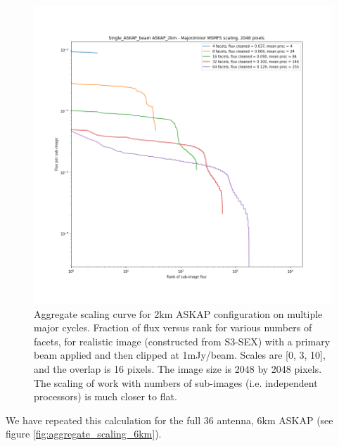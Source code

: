 \documentclass[11pt,a4paper,variablewidth]{article}
\begin{document}
\begin{figure}[h]
  \centering
  \includegraphics[width=\textwidth]{./pngs/aggregate_scaling_single_ASKAP_beam_ASKAP_2km_2048.png}
  \caption{Aggregate scaling curve for 2km ASKAP configuration on multiple major cycles. Fraction of flux versus rank for various numbers of facets, for realistic image (constructed from S3-SEX) with a primary beam applied and then clipped at 1mJy/beam. Scales are [0, 3, 10], and the overlap is 16 pixels. The image size is 2048 by 2048 pixels. The scaling of work with numbers of sub-images (i.e. independent processors) is much closer to flat.}
  \label{fig:aggregate_scaling_2km}
\end{figure}

We have repeated this calculation for the full 36 antenna, 6km ASKAP (see figure \ref{fig:aggregate_scaling_6km}). 
\end{document}
